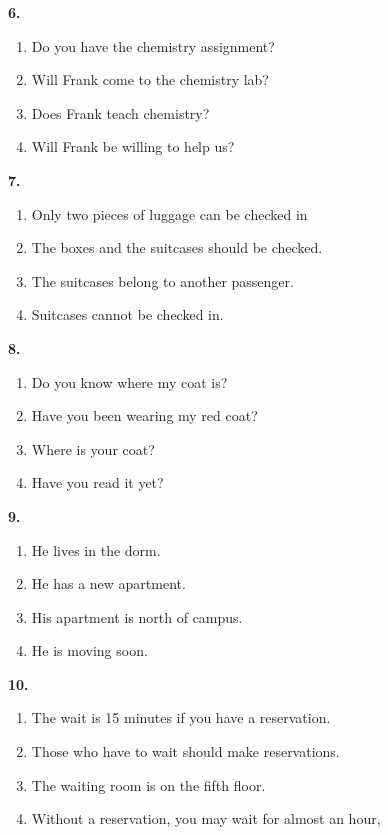 \documentclass[12pt]{article}
\begin{document}
\par
\vspace{0.25\baselineskip}
\noindent\textbf{6.}
\begin{enumerate}[label=(\Alph*),leftmargin=*,itemsep=0.2em]
\item Do you have the chemistry assignment?
\item Will Frank come to the chemistry lab?
\item Does Frank teach chemistry?
\item Will Frank be willing to help us?
\end{enumerate}
\par
\vspace{0.25\baselineskip}
\noindent\textbf{7.}
\begin{enumerate}[label=(\Alph*),leftmargin=*,itemsep=0.2em]
\item Only two pieces of luggage can be checked in
\item The boxes and the suitcases should be checked.
\item The suitcases belong to another passenger.
\item Suitcases cannot be checked in.
\end{enumerate}
\par
\vspace{0.25\baselineskip}
\noindent\textbf{8.}
\begin{enumerate}[label=(\Alph*),leftmargin=*,itemsep=0.2em]
\item Do you know where my coat is?
\item Have you been wearing my red coat?
\item Where is your coat?
\item Have you read it yet?
\end{enumerate}
\par
\vspace{0.25\baselineskip}
\noindent\textbf{9.}
\begin{enumerate}[label=(\Alph*),leftmargin=*,itemsep=0.2em]
\item He lives in the dorm.
\item He has a new apartment.
\item His apartment is north of campus.
\item He is moving soon.
\end{enumerate}
\par
\vspace{0.25\baselineskip}
\noindent\textbf{10.}
\begin{enumerate}[label=(\Alph*),leftmargin=*,itemsep=0.2em]
\item The wait is 15 minutes if you have a reservation.
\item Those who have to wait should make reservations.
\item The waiting room is on the fifth floor.
\item Without a reservation, you may wait for almost an hour,
\end{enumerate}
\end{document}
